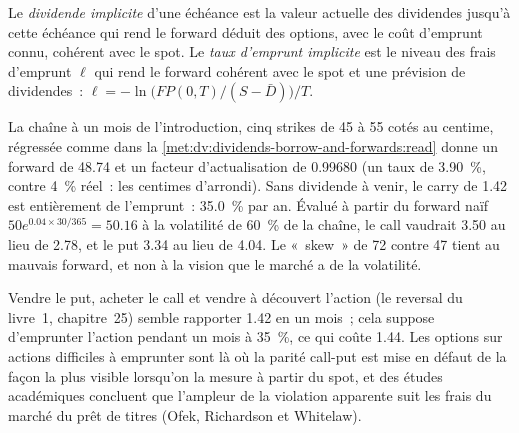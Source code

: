 \begin{definition}\label{def:dv:dividends-borrow-and-forwards:implied}
Le \emph{dividende implicite} d'une échéance est la valeur actuelle
des dividendes jusqu'à cette échéance qui rend le forward déduit des options, avec
le coût d'emprunt connu, cohérent avec le spot. Le \emph{taux d'emprunt
implicite} est le niveau des frais d'emprunt $\ell$ qui rend le forward
cohérent avec le spot et une prévision de dividendes~:
$\ell=-\ln\bigl(FP(0,T)/(S-\bar D)\bigr)/T$.
\end{definition}

\begin{example}\label{ex:dv:dividends-borrow-and-forwards:htb}
La chaîne à un mois de l'introduction, cinq strikes de 45 à 55 cotés au centime,
régressée comme dans la \cref{met:dv:dividends-borrow-and-forwards:read} donne un forward de
48.74 et un facteur d'actualisation de 0.99680 (un taux de 3.90~\%, contre 4~\% réel~: les
centimes d'arrondi). Sans dividende à venir, le carry de 1.42 est entièrement de l'emprunt~: 35.0~\% par
an. Évalué à partir du forward naïf $50e^{0.04\times30/365}=50.16$ à la volatilité de 60~\%
de la chaîne, le call vaudrait 3.50 au lieu de 2.78, et le put 3.34 au lieu de
4.04. Le «~skew~» de 72 contre 47 tient au mauvais forward, et non à la vision que le marché
a de la volatilité.
\end{example}

Vendre le put, acheter le call et vendre à découvert l'action (le reversal du
livre~1, chapitre~25) semble rapporter 1.42 en un mois~; cela suppose d'emprunter l'action
pendant un mois à 35~\%, ce qui coûte 1.44. Les options sur actions difficiles à emprunter sont là où
la parité call-put est mise en défaut de la façon la plus visible lorsqu'on la mesure à partir du spot, et des études académiques concluent que
l'ampleur de la violation apparente suit les frais du marché du prêt de titres
(Ofek, Richardson et Whitelaw).

